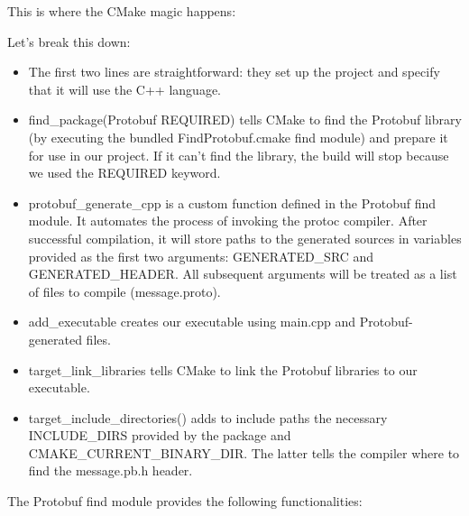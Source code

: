  This is where the CMake magic happens:



Let’s break this down:

\begin{itemize}
\item
The first two lines are straightforward: they set up the project and specify that it will use the C++ language.

\item
find\_package(Protobuf REQUIRED) tells CMake to find the Protobuf library (by executing the bundled FindProtobuf.cmake find module) and prepare it for use in our project. If it can’t find the library, the build will stop because we used the REQUIRED keyword.

\item
protobuf\_generate\_cpp is a custom function defined in the Protobuf find module. It automates the process of invoking the protoc compiler. After successful compilation, it will store paths to the generated sources in variables provided as the first two arguments: GENERATED\_SRC and GENERATED\_HEADER. All subsequent arguments will be treated as a list of files to compile (message.proto).

\item
add\_executable creates our executable using main.cpp and Protobuf-generated files.

\item
target\_link\_libraries tells CMake to link the Protobuf libraries to our executable.

\item
target\_include\_directories() adds to include paths the necessary INCLUDE\_DIRS provided by the package and CMAKE\_CURRENT\_BINARY\_DIR. The latter tells the compiler where to find the message.pb.h header.
\end{itemize}

The Protobuf find module provides the following functionalities:


